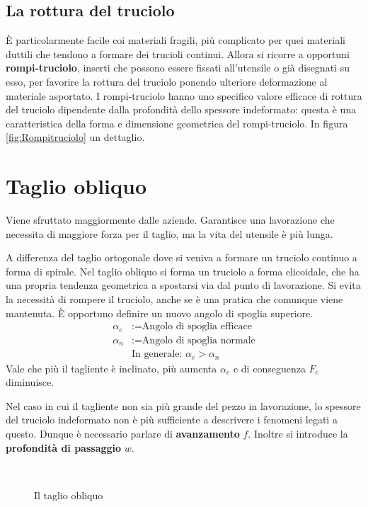 \subsection{La rottura del truciolo}
È particolarmente facile coi materiali fragili, più
complicato per quei materiali duttili che tendono
a formare dei trucioli continui.
Allora si ricorre a opportuni \textbf{rompi-truciolo},
inserti che possono essere fissati all'utensile o già
disegnati su esso, per favorire la rottura del 
truciolo ponendo ulteriore deformazione al materiale
asportato.
I rompi-truciolo hanno uno specifico valore efficace
di rottura del truciolo dipendente dalla profondità 
dello spessore indeformato: questa è una 
caratteristica della forma e dimensione geometrica 
del rompi-truciolo. In figura \ref{fig:Rompitruciolo} 
un dettaglio.

\section{Taglio obliquo}
Viene sfruttato maggiormente dalle aziende.
Garantisce una lavorazione che necessita di maggiore
forza per il taglio, ma la vita del utensile
è più lunga.

A differenza del taglio ortogonale dove si veniva
a formare un truciolo continuo a forma di spirale.
Nel taglio obliquo si forma un truciolo a forma 
elicoidale, che ha una propria tendenza geometrica
a spostarsi via dal punto di lavorazione.
Si evita la necessità di rompere il truciolo, anche 
se è una pratica che comunque viene mantenuta.
È opportuno definire un nuovo angolo di spoglia 
superiore.
\begin{align}
\alpha_e &:= \text{Angolo di spoglia efficace}\\
\alpha_n &:= \text{Angolo di spoglia normale}\\
&\text{In generale: }\alpha_e > \alpha_n
\end{align}
Vale che più il tagliente è inclinato, più aumenta $\alpha_e$ 
e di conseguenza $F_c$ diminuisce.

Nel caso in cui il tagliente non sia più grande del
pezzo in lavorazione, lo spessore del truciolo 
indeformato non è più sufficiente a descrivere i 
fenomeni legati a questo. Dunque è necessario parlare
di \textbf{avanzamento} $f$. Inoltre si introduce 
la \textbf{profondità di passaggio} $w$.

\begin{figure}
\centering
{}\\
\quad
{}
\caption{Il taglio obliquo}
\label{fig:TaglioObliquo}
\end{figure}


